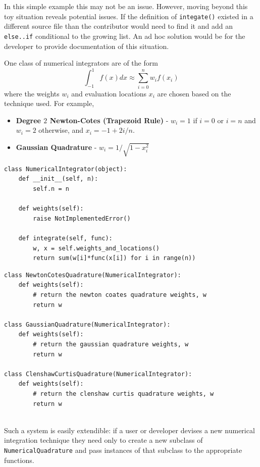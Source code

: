 In this simple example this may not be an issue. However, moving beyond this toy
situation reveals potential issues. If the definition of {\tt integate()}
existed in a different source file than the contributor would need to find it
and add an \verb=else..if= conditional to the growing list. An ad hoc solution
would be for the developer to provide documentation of this situation. %




One class of numerical integrators are of the form
\[
  \int_{-1}^1 f(x) dx \approx \sum_{i=0}^n w_i f(x_i)
\]
where the weights $w_i$ and evaluation locations $x_i$ are chosen based on the
technique used. For example,
\begin{itemize}
\item {\bf Degree $2$ Newton-Cotes (Trapezoid Rule)} - $w_i = 1$ if $i=0$ or
  $i=n$ and $w_i = 2$ otherwise, and $x_i = -1 + 2i/n$.
  \item {\bf Gaussian Quadrature} - $w_i = 1/\sqrt{1-x_i^2}$
\end{itemize}


\begin{lstlisting}
class NumericalIntegrator(object):
    def __init__(self, n):
        self.n = n

    def weights(self):
        raise NotImplementedError()

    def integrate(self, func):
        w, x = self.weights_and_locations()
        return sum(w[i]*func(x[i]) for i in range(n))
\end{lstlisting}


\begin{lstlisting}
class NewtonCotesQuadrature(NumericalIntegrator):
    def weights(self):
        # return the newton coates quadrature weights, w
        return w

class GaussianQuadrature(NumericalIntegrator):
    def weights(self):
        # return the gaussian quadrature weights, w
        return w

class ClenshawCurtisQuadrature(NumericalIntegrator):
    def weights(self):
        # return the clenshaw curtis quadrature weights, w
        return w
         
\end{lstlisting}

Such a system is easily extendible: if a user or developer devises a new
numerical integration technique they need only to create a new subclass of {\tt
  NumericalQuadrature} and pass instances of that subclass to the appropriate
functions.

